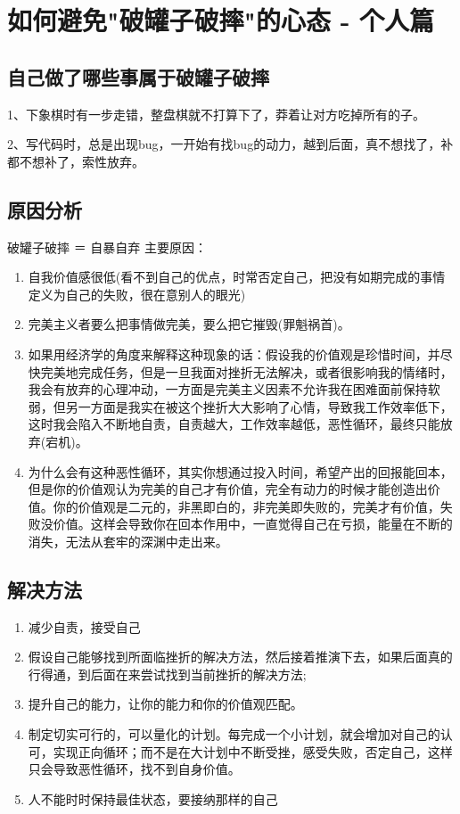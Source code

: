 \chapter{如何避免"破罐子破摔"的心态 - 个人篇}

\section{自己做了哪些事属于破罐子破摔}

1、下象棋时有一步走错，整盘棋就不打算下了，莽着让对方吃掉所有的子。

2、写代码时，总是出现bug，一开始有找bug的动力，越到后面，真不想找了，补都不想补了，索性放弃。

\section{原因分析}
破罐子破摔 ＝ 自暴自弃
主要原因：
\begin{enumerate}
    \item 自我价值感很低(看不到自己的优点，时常否定自己，把没有如期完成的事情定义为自己的失败，很在意别人的眼光)
    \item 完美主义者要么把事情做完美，要么把它摧毁(罪魁祸首)。
    \item 如果用经济学的角度来解释这种现象的话：假设我的价值观是珍惜时间，并尽快完美地完成任务，但是一旦我面对挫折无法解决，或者很影响我的情绪时，我会有放弃的心理冲动，一方面是完美主义因素不允许我在困难面前保持软弱，但另一方面是我实在被这个挫折大大影响了心情，导致我工作效率低下，这时我会陷入不断地自责，自责越大，工作效率越低，恶性循环，最终只能放弃(宕机)。
    \item 为什么会有这种恶性循环，其实你想通过投入时间，希望产出的回报能回本，但是你的价值观认为完美的自己才有价值，完全有动力的时候才能创造出价值。你的价值观是二元的，非黑即白的，非完美即失败的，完美才有价值，失败没价值。这样会导致你在回本作用中，一直觉得自己在亏损，能量在不断的消失，无法从套牢的深渊中走出来。
\end{enumerate}

\section{解决方法}
\begin{enumerate}
    \item 减少自责，接受自己
    \item 假设自己能够找到所面临挫折的解决方法，然后接着推演下去，如果后面真的行得通，到后面在来尝试找到当前挫折的解决方法;
    \item 提升自己的能力，让你的能力和你的价值观匹配。
    \item 制定切实可行的，可以量化的计划。每完成一个小计划，就会增加对自己的认可，实现正向循环；而不是在大计划中不断受挫，感受失败，否定自己，这样只会导致恶性循环，找不到自身价值。
    \item 人不能时时保持最佳状态，要接纳那样的自己
\end{enumerate}


